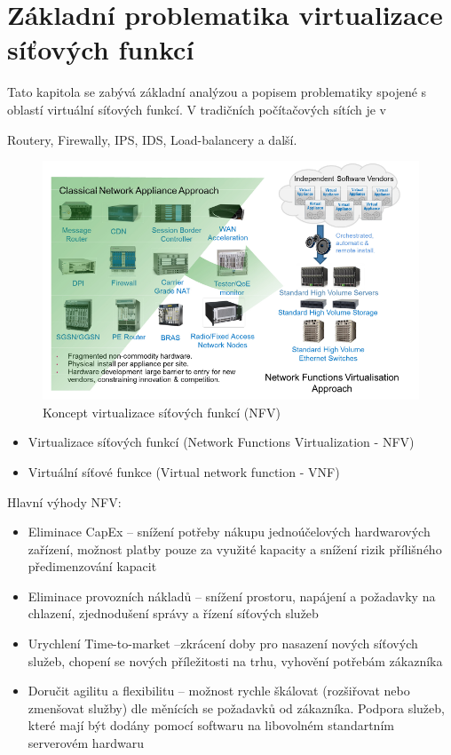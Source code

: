 \chapter{Základní problematika virtualizace síťových funkcí}

Tato kapitola se zabývá základní analýzou a popisem problematiky spojené s oblastí virtuální síťových funkcí. V tradičních počítačových sítích je v

Routery, Firewally, IPS, IDS, Load-balancery a další.


\begin{figure}[h]
\begin{centering}
\includegraphics[scale=0.5]{images/vize_NFV}
\par\end{centering}
\caption{Koncept virtualizace síťových funkcí (NFV)\label{fig:vize_NFV}}
\end{figure}

\begin{itemize}
\item Virtualizace síťových funkcí (Network Functions Virtualization - NFV)
\item Virtuální síťové funkce (Virtual network function - VNF)
\end{itemize}

Hlavní výhody NFV:

\begin{itemize}
\item Eliminace CapEx – snížení potřeby nákupu jednoúčelových hardwarových zařízení, možnost platby pouze za využité kapacity a snížení rizik přílišného předimenzování kapacit
\item Eliminace provozních nákladů – snížení prostoru, napájení a požadavky na chlazení, zjednodušení správy a řízení síťových služeb
\item Urychlení Time-to-market –zkrácení doby pro nasazení nových síťových služeb, chopení se nových příležitosti na trhu, vyhovění potřebám zákazníka
\item Doručit agilitu a flexibilitu – možnost rychle škálovat (rozšiřovat nebo zmenšovat služby) dle měnících se požadavků od zákazníka. Podpora služeb, které mají být dodány pomocí softwaru na libovolném standartním serverovém hardwaru
\end{itemize}


